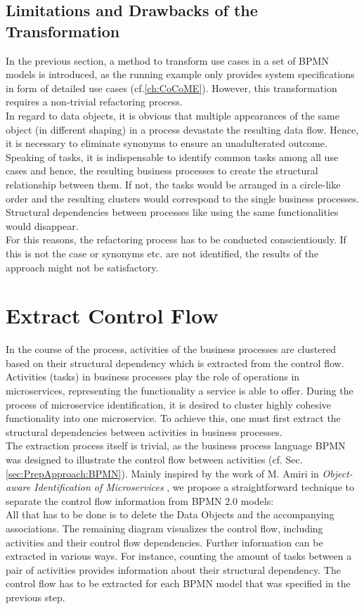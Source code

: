 \subsection{Limitations and Drawbacks of the Transformation}
In the previous section, a method to transform use cases in a set of BPMN models is introduced, as the running example only provides system specifications in form of detailed use cases (cf.\ref{ch:CoCoME}). However, this transformation requires a non-trivial refactoring process. \\
In regard to data objects, it is obvious that multiple appearances of the same object (in different shaping) in a process devastate the resulting data flow. Hence, it is necessary to eliminate synonyms to ensure an unadulterated outcome.\\
Speaking of tasks, it is indispensable to identify common tasks among all use cases and hence, the resulting business processes to create the structural relationship between them. If not, the tasks would be arranged in a circle-like order and the resulting clusters would correspond to the single business processes. Structural dependencies between processes like using the same functionalities would disappear.\\
For this reasons, the refactoring process has to be conducted 
conscientiously. If this is not the case or synonyms etc. are not identified, the results of the approach might not be satisfactory.




\section{Extract Control Flow}
\label{sec:Solution:ExtractControlFlow}
In the course of the process, activities of the business processes are clustered based on their structural dependency which is extracted from the control flow. Activities (tasks) in business processes play the role of operations in microservices, representing the functionality a service is able to offer. During the process of microservice identification, it is desired to cluster highly cohesive functionality into one microservice. To achieve this, one must first extract the structural  dependencies between activities in business processes. \\
The extraction process itself is trivial, as the business process language BPMN was designed to illustrate the control flow between activities (cf. Sec.\ref{sec:PrepApproach:BPMN}). Mainly inspired by the work of M. Amiri in \textit{Object-aware Identification of Microservices} \cite{ObjectAwareAmiri}, we propose a straightforward technique to separate the control flow information from BPMN 2.0 models:\\
All that has to be done is to delete the Data Objects and the accompanying associations. The remaining diagram visualizes the control flow, including activities and their control flow dependencies. Further information can be extracted in various ways. For instance, counting the amount of tasks between a pair of activities provides information about their structural dependency. The control flow has to be extracted for each BPMN model that was specified in the previous step.
